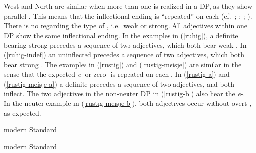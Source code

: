\documentclass[output=paper,colorlinks,citecolor=brown]{langscibook}
\begin{document}
West and North  are similar when more than one   is realized in a DP, as they show parallel . This means that the inflectional ending is ``repeated'' on each  (cf.~\citealp{Bildhauer2019}; \citealp{Peter2013}; \citealp{Roehrs2009}; \citealp{Sahel2021}). There is no  regarding the type of , i.e.~weak or strong. All  adjectives within one DP show the same inflectional ending. In the examples in (\ref{ruhig}), a definite  bearing strong  precedes a sequence of two adjectives, which both bear weak . In (\ref{ruhig-indef}) an uninflected  precedes a sequence of two  adjectives, which both bear strong . The  examples in (\ref{rustig}) and (\ref{rustig-meisje}) are similar in the sense that the expected \textit{e}- or zero- is repeated on each . In (\ref{rustig-a}) and (\ref{rustig-meisje-a}) a definite  precedes a sequence of two adjectives, and both inflect. The two adjectives in the non-neuter  DP in (\ref{rustig-b}) also bear the \textit{e}-. In the  neuter example in (\ref{rustig-meisje-b}), both adjectives occur without overt , as expected.

\ea modern Standard  \label{ruhig}
\z
\z 

\ea modern Standard  \label{ruhig-indef}
\z
\z 
\end{document}
